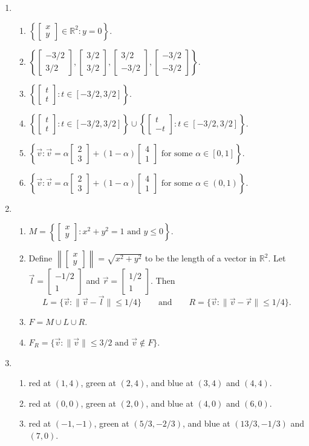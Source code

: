 \documentclass[red]{tutorial}
\newcommand{\R}{\mathbb{R}}
\newcommand{\mat}[1]{\begin{bmatrix}#1\end{bmatrix}}
\theoremstyle{definition}
\theoremstyle{theorem}
\begin{document}
	\begin{solutions}
		\begin{enumerate}
			\item \begin{enumerate}
					\item $\left\{\mat{x\\y}\in\R^2:y=0\right\}$.
					\item $\left\{\mat{-3/2\\3/2},\mat{3/2\\3/2},\mat{3/2\\-3/2},\mat{-3/2\\-3/2}
							\right\}$.
					\item $\left\{\mat{t\\t}:t\in[-3/2,3/2]\right\}$.
					\item $\left\{\mat{t\\t}:t\in[-3/2,3/2]\right\}\cup \left\{\mat{t\\-t}:t\in[-3/2,3/2]\right\}$.
					\item $\left\{\vec v: \vec v=\alpha \mat{2\\3}+(1-\alpha)\mat{4\\1}\text{ for some }\alpha\in[0,1]\right\}$.
					\item $\left\{\vec v: \vec v=\alpha \mat{2\\3}+(1-\alpha)\mat{4\\1}\text{ for some }\alpha\in(0,1)\right\}$.
			\end{enumerate}
			\item \begin{enumerate}
					\item $M=
						\left\{\mat{x\\y}: x^2+y^2 = 1\text{ and }y\leq 0\right\}$.
					\item Define $\left\|\mat{x\\y}\right\|=\sqrt{x^2+y^2}$ to
						be the length of a vector in $\mathbb R^2$.
						Let $\vec l=\mat{-1/2\\1}$ and $\vec r=\mat{1/2\\1}$. Then \[L=\{\vec v:\|\vec v-\vec l\|\leq 1/4\}
						\qquad\text{and}\qquad R=\{\vec v:\|\vec v-\vec r\|\leq 1/4\}.\]
					\item $F=M\cup L\cup R$.
					\item $F_R=\{\vec v:\|\vec v\| \leq 3/2\text{ and }\vec v\notin F\}$.
			\end{enumerate}
			\item \begin{enumerate}
				\item red at $(1,4)$, green at $(2,4)$, and blue at $(3,4)$ and $(4,4)$.
				\item red at $(0,0)$, green at $(2,0)$, and blue at $(4,0)$ and $(6,0)$.
				\item red at $(-1,-1)$, green at $(5/3,-2/3)$, and blue at $(13/3,-1/3)$ and $(7,0)$.
			\end{enumerate}
		\end{enumerate}
	
	\end{solutions}
\end{document}
